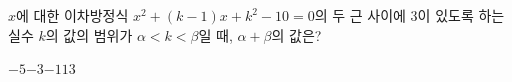 \hspace*{2mm}\begin{minipage}[t]{\dimexpr\linewidth-2mm\relax}\vspace{0pt}
$x$에 대한 이차방정식 $x^2+(k-1)x+k^2-10=0$의 두 근 사이에 $3$이 있도록 하는 실수 $k$의 값의 범위가 $\alpha<k<\beta$일 때, $\alpha+\beta$의 값은?
\begin{choices32}{$-5$}{$-3$}{$-1$}{$1$}{$3$}\end{choices32}\end{minipage}
